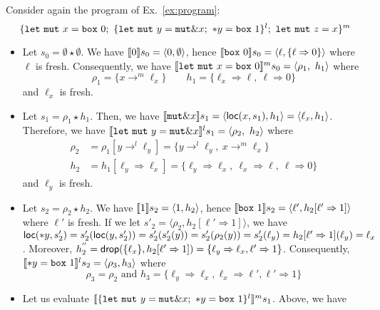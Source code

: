 \begin{example}
  Consider again the program of Ex.~\ref{ex:program}:
  \[
    \{
      \mathtt{let\ mut}\ x = \mathtt{box}\ 0;\
      \{\mathtt{let\ mut}\ y = \mathtt{mut}\borrow x;\
      \mathtt{*}y = \mathtt{box}\ 1\}^l;\
      \mathtt{let\ mut}\ z = x
    \}^m
  \]
  \begin{itemize}
    \item Let $s_0=\emptyset \star \emptyset$.
    We have $\den[0]{s_0} = \langle 0,\emptyset\rangle$, hence
    $\den[\mathtt{box}\ 0]{s_0} =
    \langle\ell,\{\ell\Rightarrow 0\}\rangle$ where $\ell$ is fresh.
    Consequently, we have
    $\denl[\mathtt{let\ mut}\ x = \mathtt{box}\ 0]{m}{s_0} =
    \langle \rho_1,\ h_1\rangle$ where
    \[\rho_1=\{x\to^m\ell_x\} \qquad
    h_1 = \{\ell_x\Rightarrow \ell,\ \ell\Rightarrow 0\}\]
    and $\ell_x$ is fresh.
    \item Let $s_1 = \rho_1 \star h_1$.
    Then, we have $\den[\mathtt{mut}\borrow x]{s_1} =
    \langle\loc(x,s_1),h_1\rangle = \langle\ell_x, h_1\rangle$.
    Therefore, we have
    $\denl[\mathtt{let\ mut}\ y = \mathtt{mut}\borrow x]{l}{s_1} =
    \langle \rho_2,\ h_2\rangle$
    where
    \begin{align*}
      \rho_2 & = \rho_1[y\to^l\ell_y] = \{y\to^l\ell_y,\ x\to^m\ell_x\}\\
      h_2 & = h_1[\ell_y\Rightarrow \ell_x] =
      \{\ell_y\Rightarrow \ell_x,\ \ell_x\Rightarrow \ell,\ \ell\Rightarrow 0\}
    \end{align*}
    and $\ell_y$ is fresh.
    \item Let $s_2 = \rho_2 \star h_2$.
    We have $\den[1]{s_2} = \langle 1,h_2\rangle$, hence
    $\den[\mathtt{box}\ 1]{s_2} =
    \langle\ell',h_2[\ell'\Rightarrow 1]\rangle$ where $\ell'$ is fresh.
    If we let $s'_2=\langle\rho_2,h_2[\ell'\Rightarrow 1]\rangle$,
    we have $\loc(\mathtt{*}y,s'_2) = s'_2(\loc(y,s'_2)) =
    s'_2(s'_2(y)) = s'_2(\rho_2(y)) = s'_2(\ell_y) = h_2[\ell'\Rightarrow 1](\ell_y)
    = \ell_x$. Moreover, $h^{''}_2=\drop(\{\ell_x\},h_2[\ell'\Rightarrow 1]) =
    \{\ell_y\Rightarrow \ell_x,\ell'\Rightarrow 1\}$. Consequently,
    $\denl[\mathtt{*}y = \mathtt{box}\ 1]{l}{s_2} =
    \langle\rho_3,h_3\rangle$ where
    \[\rho_3 = \rho_2
    \text{ and }
    h_3 = \{\ell_y\Rightarrow \ell_x,\ell_x\Rightarrow\ell',
    \ell'\Rightarrow 1\}\]
    \item Let us evaluate
    $\denl[\{\mathtt{let\ mut}\ y = \mathtt{mut}\borrow x;\
    \mathtt{*}y = \mathtt{box}\ 1\}^l]{m}{s_1}$. Above, we have

\end{itemize}
\end{example}
